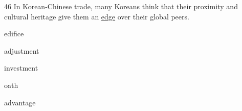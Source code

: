 \begin{question}{46}
In Korean-Chinese trade, many Koreans think that their proximity and cultural heritage give them an \uline{edge} over their global peers.
\begin{choices}
  \item edifice
  \item adjustment
  \item investment
  \item oath
  \item advantage
\end{choices}
\end{question}
